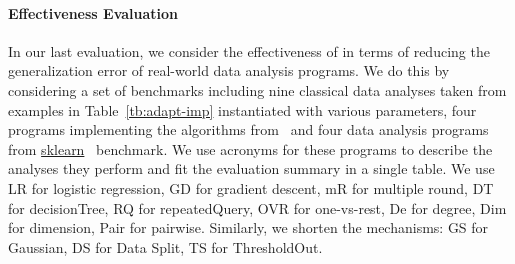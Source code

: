 \paragraph{Effectiveness Evaluation}

In our last evaluation, we consider the effectiveness of {\THESYSTEM} in terms of reducing the generalization error of real-world data analysis programs.
We do this by considering a set of benchmarks including 
nine classical data analyses taken from examples in Table~\ref{tb:adapt-imp} instantiated with various parameters,
four programs implementing the algorithms from~\cite{Jamieson2015TheAO}
and four data analysis programs 
from \hyperlink{https://github.com/scikit-learn/scikit-learn/tree/main/examples}{sklearn}~\cite{SklearnBenchmark} benchmark.
{We use acronyms for these programs to describe the analyses they perform and fit the evaluation summary in a single table. We use LR for logistic regression, GD for gradient descent, mR for multiple round, DT for decisionTree, RQ for repeatedQuery, OVR for one-vs-rest, De for degree, Dim for dimension, Pair for pairwise. Similarly, we shorten the mechanisms: GS for Gaussian, DS for Data Split,
TS for ThresholdOut.  }

